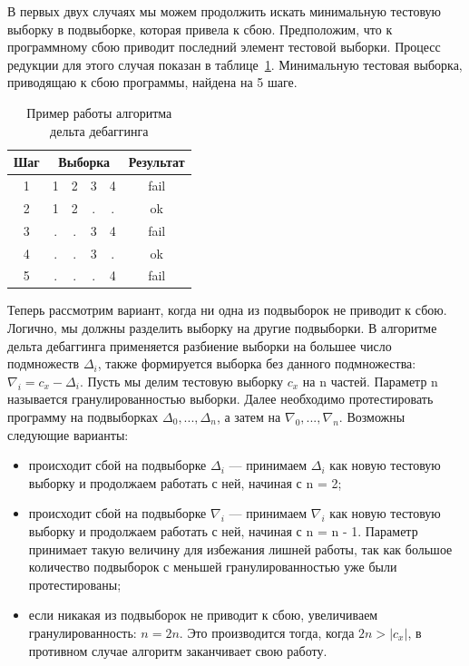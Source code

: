 В первых двух случаях мы можем продолжить искать минимальную тестовую выборку в подвыборке, которая привела к сбою. Предположим, что к программному сбою приводит последний элемент тестовой выборки. Процесс редукции для этого случая показан в таблице~\ref{tab:ddminex}. Минимальную тестовая выборка, приводящаю к сбою программы, найдена на 5 шаге.
\begin{table}[]
\center
\caption{\label{tab:ddminex}Пример работы алгоритма дельта дебаггинга}
\begin{tabular}{| c | *{4}{c} | c |}
\hline
\bf Шаг & \multicolumn{4}{|c|}{\bf Выборка} & {\bf Результат}\\
\hline
1 &  1 & 2 & 3 & 4 & fail \\
\hline
2 &  1 & 2 & . & . & ok \\
\hline
3 &  . & . & 3 & 4 & fail \\
\hline
4 &  . & . & 3 & . & ok \\
\hline
5 &  . & . & . & 4 & fail \\
\hline
\end{tabular}
\end{table}

Теперь рассмотрим вариант, когда ни одна из подвыборок не приводит к сбою. Логично, мы должны разделить выборку на другие подвыборки. В алгоритме дельта дебаггинга применяется разбиение выборки на большее число подмножеств $\Delta_i$, также формируется выборка без данного подмножества: $\nabla_i = c_x - \Delta_i$. Пусть мы делим тестовую выборку $c_x$ на n частей. Параметр n называется гранулированностью выборки. Далее необходимо протестировать программу на подвыборках $\Delta_0,...,\Delta_n$, а затем на $\nabla_0,...,\nabla_n$. Возможны следующие варианты:
\begin{itemize}
\item происходит сбой на подвыборке $\Delta_i$ --- принимаем $\Delta_i$ как новую тестовую выборку и продолжаем работать с ней, начиная с n = 2;
\item происходит сбой на подвыборке $\nabla_i$ --- принимаем $\nabla_i$ как новую тестовую выборку и продолжаем работать с ней, начиная с n = n - 1. Параметр принимает такую величину для избежания лишней работы, так как большое количество подвыборок с меньшей гранулированностью уже были протестированы;
\item если никакая из подвыборок не приводит к сбою, увеличиваем гранулированность: $n = 2n$. Это производится тогда, когда $2n > |c_x|$, в противном случае алгоритм заканчивает свою работу.
\end{itemize}

